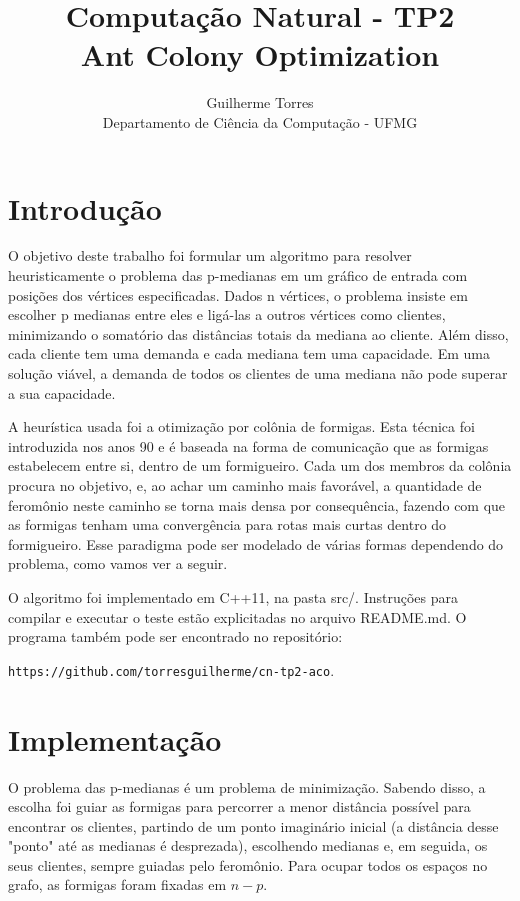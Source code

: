 \documentclass[11pt]{article}
\begin{document}
\title{Computação Natural - TP2\\Ant Colony Optimization}
\author{Guilherme Torres\\Departamento de Ciência da Computação - UFMG}
\date{}
\maketitle

\section{Introdução}

O objetivo deste trabalho foi formular um algoritmo para resolver heuristicamente o problema das p-medianas em um gráfico de entrada com posições dos vértices especificadas. Dados n vértices, o problema insiste em escolher p medianas entre eles e ligá-las a outros vértices como clientes, minimizando o somatório das distâncias totais da mediana ao cliente. Além disso, cada cliente tem uma demanda e cada mediana tem uma capacidade. Em uma solução viável, a demanda de todos os clientes de uma mediana não pode superar a sua capacidade.

A heurística usada foi a otimização por colônia de formigas. Esta técnica foi introduzida nos anos 90 e é baseada na forma de comunicação que as formigas estabelecem entre si, dentro de um formigueiro. Cada um dos membros da colônia procura no objetivo, e, ao achar um caminho mais favorável, a quantidade de feromônio neste caminho se torna mais densa por consequência, fazendo com que as formigas tenham uma convergência para rotas mais curtas dentro do formigueiro. Esse paradigma pode ser modelado de várias formas dependendo do problema, como vamos ver a seguir.

O algoritmo foi implementado em C++11, na pasta src/. Instruções para compilar e executar o teste estão explicitadas no arquivo README.md. O programa também pode ser encontrado no repositório:

\texttt{https://github.com/torresguilherme/cn-tp2-aco}.

\section{Implementação}

O problema das p-medianas é um problema de minimização. Sabendo disso, a escolha foi guiar as formigas para percorrer a menor distância possível para encontrar os clientes, partindo de um ponto imaginário inicial (a distância desse "ponto" até as medianas é desprezada), escolhendo medianas e, em seguida, os seus clientes, sempre guiadas pelo feromônio. Para ocupar todos os espaços no grafo, as formigas foram fixadas em $n - p$.
\end{document}
